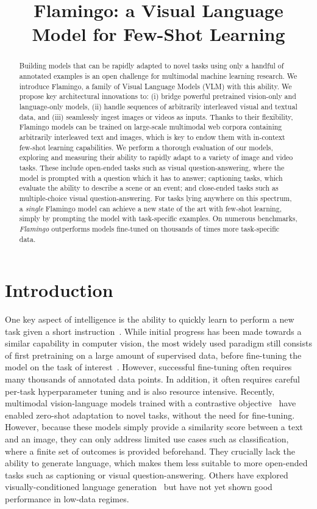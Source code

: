 \title{Flamingo: a Visual Language Model for Few-Shot Learning}

\begin{abstract}
Building models that can be rapidly adapted to novel tasks using only a handful of annotated examples is an open challenge for multimodal machine learning research. We introduce Flamingo, a family of Visual Language Models (VLM) with this ability. We propose key architectural innovations to: (i) bridge powerful pretrained vision-only and language-only models, (ii) handle sequences of arbitrarily interleaved visual and textual data, and (iii) seamlessly ingest images or videos as inputs. Thanks to their flexibility, Flamingo models can be trained on large-scale multimodal web corpora containing arbitrarily interleaved text and images, which is key to endow them with in-context few-shot learning capabilities. We perform a thorough evaluation of our models, exploring and measuring their ability to rapidly adapt to a variety of image and video tasks. These include open-ended tasks such as visual question-answering, where the model is prompted with a question which it has to answer; captioning tasks, which evaluate the ability to describe a scene or an event; and close-ended tasks such as multiple-choice visual question-answering. For tasks lying anywhere on this spectrum, a \emph{single} Flamingo model can achieve a new state of the art with few-shot learning, simply by prompting the model with task-specific examples. On numerous benchmarks, \emph{Flamingo} outperforms models fine-tuned on thousands of times more task-specific data.
\end{abstract}

\section{Introduction}
One key aspect of intelligence is the ability to quickly learn to perform a new task given a short instruction~\citep{griffiths2019doing,markman1989categorization}. While initial progress has been made towards a similar capability in computer vision, the most widely used paradigm still consists of first pretraining on a large amount of supervised data, before fine-tuning the model on the task of interest~\citep{lu2019vilbert,wang2021ufo,zellers2022merlot}. However, successful fine-tuning often requires many thousands of annotated data points. In addition, it often requires careful per-task hyperparameter tuning and is also resource intensive. Recently, multimodal vision-language models trained with a contrastive objective~\citep{align,clip} have enabled zero-shot adaptation to novel tasks, without the need for fine-tuning. However, because these models simply provide a similarity score between a text and an image, they can only address limited use cases such as classification, where a finite set of outcomes is provided beforehand. They crucially lack the ability to generate language, which makes them less suitable to more open-ended tasks such as captioning or visual question-answering. Others have explored visually-conditioned language generation~\citep{wang2021simvlm,tsimpoukelli2021multimodal,cho2021unifying,wang2022unifying,xu2021vlm} but have not yet shown good performance in low-data regimes.

